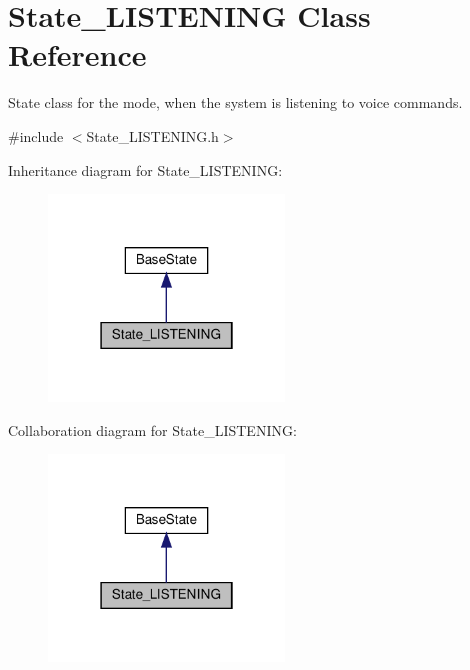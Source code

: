 \hypertarget{class_state___l_i_s_t_e_n_i_n_g}{}\section{State\+\_\+\+L\+I\+S\+T\+E\+N\+I\+NG Class Reference}
\label{class_state___l_i_s_t_e_n_i_n_g}


State class for the mode, when the system is listening to voice commands.  




{\ttfamily \#include $<$State\+\_\+\+L\+I\+S\+T\+E\+N\+I\+N\+G.\+h$>$}



Inheritance diagram for State\+\_\+\+L\+I\+S\+T\+E\+N\+I\+NG\+:
\nopagebreak
\begin{figure}[H]
\begin{center}
\leavevmode
\includegraphics[width=178pt]{class_state___l_i_s_t_e_n_i_n_g__inherit__graph}
\end{center}
\end{figure}


Collaboration diagram for State\+\_\+\+L\+I\+S\+T\+E\+N\+I\+NG\+:
\nopagebreak
\begin{figure}[H]
\begin{center}
\leavevmode
\includegraphics[width=178pt]{class_state___l_i_s_t_e_n_i_n_g__coll__graph}
\end{center}
\end{figure}
